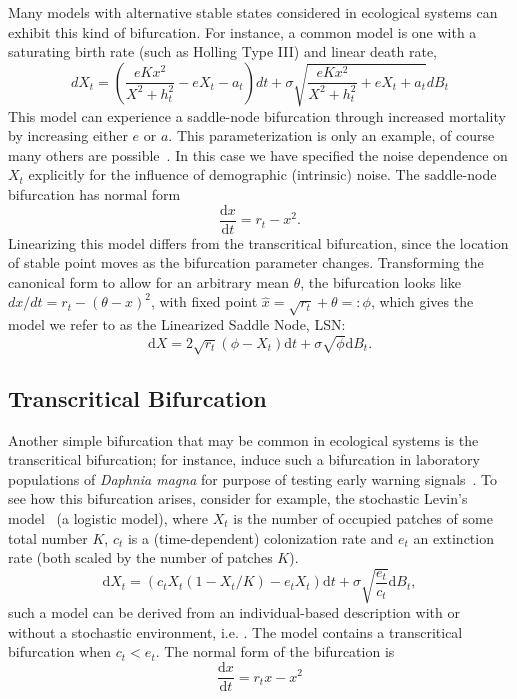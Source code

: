 \documentclass[authoryear, preprint,review,12pt]{elsarticle}
\newcommand{\ud}{\mathrm{d}}
\begin{document}
Many models with alternative stable states considered in ecological systems can exhibit this kind of bifurcation.
For instance, a common model is one with a saturating birth rate (such as Holling Type III) and linear death rate, 
\begin{equation}
dX_t = \left( \frac{e K x^2}{X^2 + h_t^2} - e X_t - a_t\right) dt + \sigma \sqrt{ \frac{e K x^2}{X^2 + h_t^2} + e X_t + a_t} dB_t \label{ass}
\end{equation}
This model can experience a saddle-node bifurcation through increased mortality by increasing either $e$ or $a$. 
This parameterization is only an example, of course many others are possible~\citep{Scheffer2009a, Scheffer2001, Strogatz2001a, Guckenheimer1983}.  
In this case we have specified the noise dependence on $X_t$ explicitly for the influence of demographic (intrinsic) noise.
The saddle-node bifurcation has normal form
\begin{equation}
\frac{\ud x}{\ud t} = r_t- x^2.
\label{saddle-node}
\end{equation}
Linearizing this model differs from the transcritical bifurcation,
since the location of stable point moves as the bifurcation parameter changes.
Transforming the canonical form to allow for an arbitrary mean $\theta$,
the bifurcation looks like $ dx/dt = r_t- (\theta-x)^2 $, with fixed point $\hat x = \sqrt{r_t} +\theta =: \phi$,
which gives the model we refer to as the Linearized Saddle Node, LSN: 
\begin{equation}
\ud X = 2\sqrt{ r_t } (\phi - X_t)\ud t + \sigma\sqrt{\phi } \ud B_t. \label{LSN}
\end{equation}


\subsection{Transcritical Bifurcation}
Another simple bifurcation that may be common in ecological systems is the transcritical bifurcation; for instance, \citet{Drake2010} induce such a bifurcation in laboratory populations of \emph{Daphnia magna} for purpose of testing early warning signals~\citep{Drake2010}.  To see how this bifurcation arises, consider for example, the stochastic Levin's model~\citep{Levins1969} (a logistic model), where $X_t$ is the number of occupied patches of some total number $K$, $c_t$ is a (time-dependent) colonization rate and $e_t$ an extinction rate (both scaled by the number of patches $K$).  
\begin{equation}
\ud X_t = \left( c_t X_t (1-X_t/K) - e_t X_t \right) \ud t + \sigma \sqrt{\frac{e_t}{c_t}} \ud B_t \label{levins},
\end{equation}
such a model can be derived from an individual-based description with or without a stochastic environment, i.e.  \citep{Kampen2007a, Nisbet2004a}.  The model contains a transcritical bifurcation when $c_t < e_t$.  The normal form of the bifurcation is
\begin{equation}
\frac{\ud x}{\ud t} = r_t x - x^2 
\label{transcritical}
\end{equation}
\end{document}
